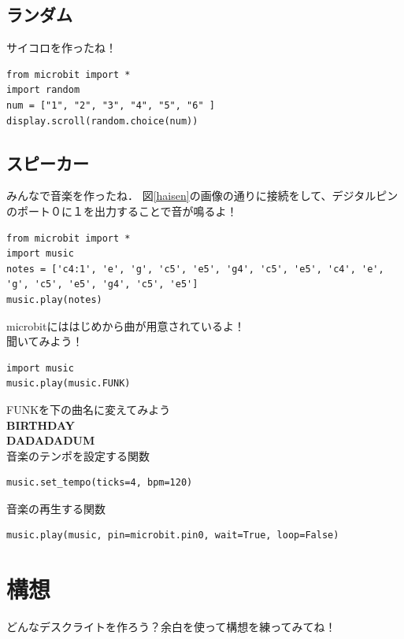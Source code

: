 \documentclass[dvipdfmx]{jsarticle}
\begin{document}
\subsection{ランダム}
サイコロを作ったね！
\begin{lstlisting} 
from microbit import *
import random
num = ["1", "2", "3", "4", "5", "6" ]
display.scroll(random.choice(num))
\end{lstlisting}
\subsection{スピーカー}
みんなで音楽を作ったね．
図\ref{haisen}の画像の通りに接続をして、デジタルピンのポート０に１を出力することで音が鳴るよ！\\
\begin{lstlisting} 
from microbit import *
import music
notes = ['c4:1', 'e', 'g', 'c5', 'e5', 'g4', 'c5', 'e5', 'c4', 'e', 'g', 'c5', 'e5', 'g4', 'c5', 'e5']
music.play(notes)
\end{lstlisting}
microbitにははじめから曲が用意されているよ！\\
聞いてみよう！
\begin{lstlisting} 
import music
music.play(music.FUNK)
\end{lstlisting}
FUNKを下の曲名に変えてみよう\\
\> \textbf{BIRTHDAY}\\
\> \textbf{DADADADUM}\\
音楽のテンポを設定する関数
\begin{lstlisting} 
music.set_tempo(ticks=4, bpm=120)
\end{lstlisting}
音楽の再生する関数
\begin{lstlisting} 
music.play(music, pin=microbit.pin0, wait=True, loop=False)
\end{lstlisting}
\section{構想}
どんなデスクライトを作ろう？余白を使って構想を練ってみてね！
\end{document}
